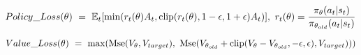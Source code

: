 $$Policy\_Loss(\theta) \ = \ \mathbb{E}_t[\min(r_t(\theta)A_t, {\rm clip}(r_t(\theta), 1 - \epsilon, 1 + \epsilon)A_t)], \ r_t(\theta) = \frac{\pi_{\theta}(a_t|s_t)}{\pi_{\theta_{old}}(a_t|s_t)}$$

$$Value\_Loss(\theta) \ = \ \max({\rm Mse}(V_{\theta}, V_{target}), \ {\rm Mse}(V_{\theta_{old}} + {\rm clip}(V_{\theta} - V_{\theta_{old}}, -\epsilon, \epsilon), V_{target})))$$


